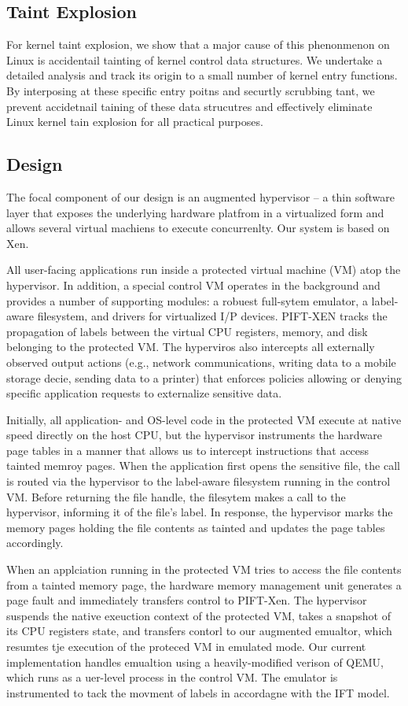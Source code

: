 \subsection{Taint Explosion}
For kernel taint explosion, we show that a major cause of this phenonmenon on
Linux is accidentail tainting of kernel control data structures.  We undertake
a detailed analysis and track its origin to a small number of kernel entry
functions.  By interposing at these specific entry poitns and securtly
scrubbing tant, we prevent accidetnail taining of these data strucutres and
effectively eliminate Linux kernel tain explosion for all practical purposes.

\subsection{Design}
The focal component of our design is an augmented hypervisor -- a thin software
layer that exposes the underlying hardware platfrom in a virtualized form and
allows several virtual machiens to execute concurrenlty.  Our system is based
on Xen.

All user-facing applications run inside a protected virtual machine (VM) atop
the hypervisor.  In addition, a special control VM operates in the background
and provides a number of supporting modules: a robuest full-sytem emulator, a
label-aware filesystem, and drivers for virtualized I/P devices.  PIFT-XEN
tracks the propagation of labels between the virtual CPU registers, memory, and
disk belonging to the protected VM.  The hyperviros also intercepts all
externally observed output actions (e.g., network communications, writing
data to a mobile storage decie, sending  data to a printer) that enforces
policies allowing or denying specific application requests to externalize
sensitive data.

Initially, all application- and OS-level code in the protected VM execute at
native speed directly on the host CPU, but the hypervisor instruments the
hardware page tables in a manner that allows us to intercept instructions that
access tainted memroy pages.  When the application first opens the sensitive file,
the call is routed via the hypervisor to the label-aware filesystem running
in the control VM.  Before returning the file handle, the filesytem makes a
call to the hypervisor, informing it of the file's label.  In response, the
hypervisor marks the memory pages holding the file contents as tainted and
updates the page tables accordingly.

When an applciation running in the protected VM tries to access the file
contents from a tainted memory page, the hardware memory management unit
generates a page fault and immediately transfers control to PIFT-Xen.
The hypervisor suspends the native exeuction context of the protected VM, takes
a snapshot of its CPU registers state, and transfers contorl to our augmented
emualtor, which resumtes tje execution of the proteced VM in emulated mode.
Our current implementation handles emualtion using a heavily-modified verison
of QEMU, which runs as a uer-level process in the control VM.  The emulator is
instrumented to tack the movment of labels in accordagne with the IFT model.

